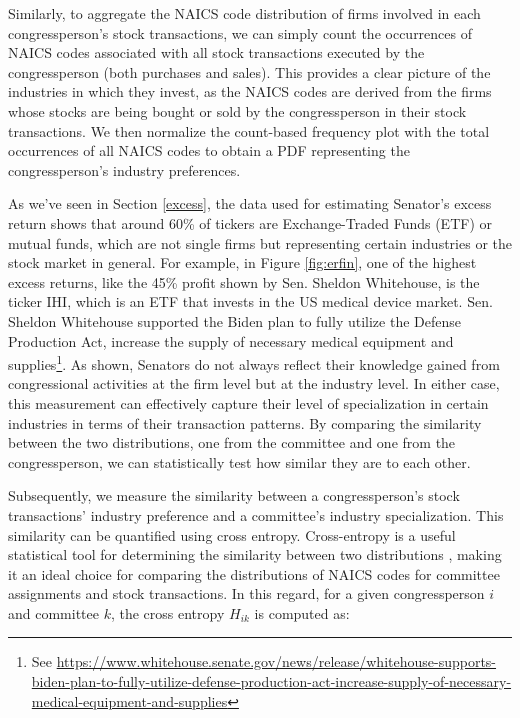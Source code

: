 \documentclass[15pt,letterpaper]{article}
\begin{document}
Similarly, to aggregate the NAICS code distribution of firms involved in each congressperson's stock transactions, we can simply count the occurrences of NAICS codes associated with all stock transactions executed by the congressperson (both purchases and sales). This provides a clear picture of the industries in which they invest, as the NAICS codes are derived from the firms whose stocks are being bought or sold by the congressperson in their stock transactions. We then normalize the count-based frequency plot with the total occurrences of all NAICS codes to obtain a PDF representing the congressperson's industry preferences.


As we've seen in Section \ref{excess}, the data used for estimating Senator's excess return shows that around 60\% of tickers are Exchange-Traded Funds (ETF)  or mutual funds, which are not single firms but representing certain industries or the stock market in general. For example, in Figure \ref{fig:erfin}, one of the highest excess returns, like the 45\% profit shown by Sen. Sheldon Whitehouse, is the ticker IHI, which is an ETF that invests in the US medical device market. Sen. Sheldon Whitehouse supported the Biden plan to fully utilize the Defense Production Act, increase the supply of necessary medical equipment and supplies\footnote{See \url{https://www.whitehouse.senate.gov/news/release/whitehouse-supports-biden-plan-to-fully-utilize-defense-production-act-increase-supply-of-necessary-medical-equipment-and-supplies}}. As shown, Senators do not always reflect their knowledge gained from congressional activities at the firm level but at the industry level. In either case, this measurement can effectively capture their level of specialization in certain industries in terms of their transaction patterns. By comparing the similarity between the two distributions, one from the committee and one from the congressperson, we can statistically test how similar they are to each other.

Subsequently, we measure the similarity between a congressperson's stock transactions' industry preference and a committee's industry specialization. This similarity can be quantified using cross entropy.
Cross-entropy is a useful statistical tool for determining the similarity between two distributions \citep{wu2018entropy, mao2013novel}, making it an ideal choice for comparing the distributions of NAICS codes for committee assignments and stock transactions. 
In this regard, for a given congressperson $i$ and committee $k$, the cross entropy $H_{ik}$ is computed as:
\end{document}
